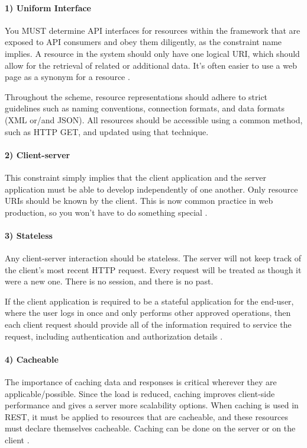 \paragraph{1) Uniform Interface}
You MUST determine API interfaces for resources within the framework that are exposed to API consumers and obey them diligently, as the constraint name implies. A resource in the system should only have one logical URI, which should allow for the retrieval of related or additional data. It's often easier to use a web page as a synonym for a resource \cite{REST}.

Throughout the scheme, resource representations should adhere to strict guidelines such as naming conventions, connection formats, and data formats (XML or/and JSON). All resources should be accessible using a common method, such as HTTP GET, and updated using that technique.

\paragraph{2) Client-server}
This constraint simply implies that the client application and the server application must be able to develop independently of one another. Only resource URIs should be known by the client. This is now common practice in web production, so you won't have to do something special \cite{REST}.

\paragraph{3) Stateless}
Any client-server interaction should be stateless. The server will not keep track of the client's most recent HTTP request. Every request will be treated as though it were a new one. There is no session, and there is no past.

If the client application is required to be a stateful application for the end-user, where the user logs in once and only performs other approved operations, then each client request should provide all of the information required to service the request, including authentication and authorization details \cite{REST}.
\paragraph{4) Cacheable}
The importance of caching data and responses is critical wherever they are applicable/possible. Since the load is reduced, caching improves client-side performance and gives a server more scalability options. When caching is used in REST, it must be applied to resources that are cacheable, and these resources must declare themselves cacheable. Caching can be done on the server or on the client \cite{REST}.
